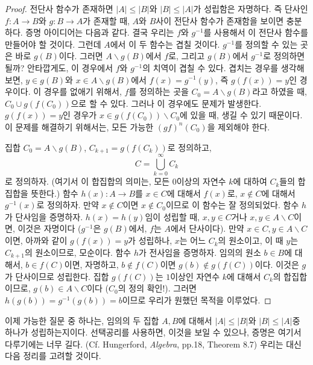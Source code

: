 \begin{proof}
    전단사 함수가 존재하면 $|A| \leq |B|$와 $|B| \leq |A|$가 성립함은 자명하다.
    즉 단사인 $f: A \to B$와 $g: B \to A$가 존재할 때, $A$와 $B$사이 전단사 함수가 존재함을 보이면 충분하다.
    증명 아이디어는 다음과 같다.
    결국 우리는 $f$와 $g^{-1}$를 사용해서 이 전단사 함수를 만들어야 할 것이다.
    그런데 $A$에서 이 두 함수는 겹칠 것이다.
    $g^{-1}$를 정의할 수 있는 곳은 바로 $g(B)$이다.
    그러면 $A \backslash g(B)$에서 $f$로, 그리고 $g(B)$에서 $g^{-1}$로 정의하면 될까?
    안타깝게도, 이 경우에서 $f$와 $g^{-1}$의 치역이 겹칠 수 있다. %
    겹치는 경우를 생각해보면, $y \in g(B)$와 $x \in A \backslash g(B)$에서 $f(x) = g^{-1}(y)$, 즉 $g(f(x)) = y$인 경우이다.
    이 경우를 없애기 위해서, $f$를 정의하는 곳을 $C_0 = A \backslash g(B)$라고 하였을 때, $C_0 \cup g(f(C_0))$으로 할 수 있다. %
    그러나 이 경우에도 문제가 발생한다.
    $g(f(x)) = y$인 경우가 $x \in g(f(C_0)) \backslash C_0$에 있을 때, 생길 수 있기 때문이다.
    이 문제를 해결하기 위해서는, 모든 가능한 $(gf)^n(C_0)$을 제외해야 한다.

    집합 $C_0 = A \backslash g(B)$, $C_{k + 1} = g(f(C_k))$로 정의하고,
    \begin{equation*}
        C = \bigcup_{k = 0}^\infty C_k
    \end{equation*}
    로 정의하자.
    (여기서 이 합집합의 의미는, 모든 $0$이상의 자연수 $k$에 대하여 $C_k$들의 합집합을 뜻한다.)
    함수 $h(x): A \to B$를 $x \in C$에 대해서 $f(x)$로, $x \not\in C$에 대해서 $g^{-1}(x)$로 정의하자.
    만약 $x \not\in C$이면 $x \not\in C_0$이므로 이 함수는 잘 정의되었다.
    함수 $h$가 단사임을 증명하자.
    $h(x) = h(y)$임이 성립할 때, $x, y \in C$거나 $x, y \in A \backslash C$이면, 이것은 자명이다 ($g^{-1}$은 $g(B)$에서, $f$는 $A$에서 단사이다).
    만약 $x \in C, y \in A \backslash C$이면, 아까와 같이 $g(f(x)) = y$가 성립하나, $x$는 어느 $C_k$의 원소이고, 이 때 $y$는 $C_{k + 1}$의 원소이므로, 모순이다.
    함수 $h$가 전사임을 증명하자.
    임의의 원소 $b \in B$에 대해서, $b \in f(C)$이면, 자명하고, $b \not\in f(C)$이면 $g(b) \not\in g(f(C))$이다.
    이것은 $g$가 단사이므로 성립한다.
    집합 $g(f(C))$는 $1$이상인 자연수 $k$에 대해서 $C_k$의 합집합이므로, $g(b) \in A \backslash C$이다 ($C_0$의 정의 확인!).
    그러면 $h(g(b)) = g^{-1}(g(b)) = b$이므로 우리가 원했던 목적을 이루었다.
\end{proof}

이제 가능한 질문 중 하나는, 임의의 두 집합 $A, B$에 대해서 $|A| \leq |B|$와 $|B| \leq |A|$중 하나가 성립하는지이다.
선택공리를 사용하면, 이것을 보일 수 있으나, 증명은 여기서 다루기에는 너무 길다. (Cf. Hungerford, \textit{Algebra}, pp.18, Theorem 8.7)
우리는 대신 다음 정리를 고려할 것이다.

